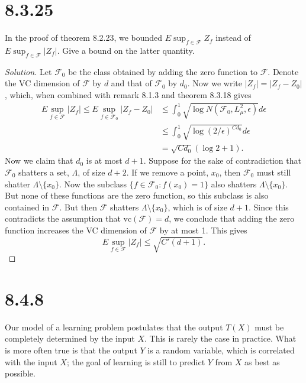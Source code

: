 \documentclass[11pt,letterpaper]{report}
\newcommand{\mcal}[1]{\mathcal{#1}}
\newcommand{\vc}{\text{vc}}
\newenvironment{solution}
{\begin{proof}[Solution]}
{\end{proof}}
\begin{document}
\section*{8.3.25}
In the proof of theorem 8.2.23, we bounded $E\sup_{f\in \mcal{F}}Z_f$ instead of $E\sup_{f\in \mcal{F}}|Z_f|$. Give a bound on the latter quantity.
\begin{solution}
	Let $\mcal{F}_0$ be the class obtained by adding the zero function to $\mcal{F}$. Denote the VC dimension of $\mcal{F}$ by $d$ and that of $\mcal{F}_0$ by $d_0$. Now we write $|Z_f| = |Z_f-Z_0|$, which, when combined with remark 8.1.3 and theorem 8.3.18 gives
	\begin{align*}
		E\sup_{f\in \mcal{F}}|Z_f| \leq E\sup_{f\in \mcal{F}_0}|Z_f-Z_0| &\leq \int_0^1\sqrt{\log N(\mcal{F}_0, L^2_\mu, \epsilon)}d\epsilon\\
		&\leq \int_0^1\sqrt{\log(2/\epsilon)^{Cd_0}}d\epsilon\\
		&= \sqrt{Cd_0}(\log 2+1).
	\end{align*}
	Now we claim that $d_0$ is at most $d+1$. Suppose for the sake of contradiction that $\mcal{F}_0$ shatters a set, $\Lambda$, of size $d+2$. If we remove a point, $x_0$, then $\mcal{F}_0$ must still shatter $\Lambda\setminus \{x_0\}$. Now the subclass $\{f\in \mcal{F}_0: f(x_0)=1\}$ also shatters $\Lambda\setminus \{x_0\}$. But none of these functions are the zero function, so this subclass is also contained in $\mcal{F}$. But then $\mcal{F}$ shatters $\Lambda\setminus \{x_0\}$, which is of size $d+1$. Since this contradicts the assumption that $\vc(\mcal{F})=d$, we conclude that adding the zero function increases the VC dimension of $\mcal{F}$ by at most 1. This gives
	\[
	E\sup_{f\in \mcal{F}}|Z_f|\leq \sqrt{C'(d+1)}.
	\]
\end{solution}










\section*{8.4.8}
Our model of a learning problem postulates that the output $T(X)$ must be completely determined by the input $X$. This is rarely the case in practice. What is more often true is that the output $Y$ is a random variable, which is correlated with the input $X$; the goal of learning is still to predict $Y$ from $X$ as best as possible.\\
\end{document}
